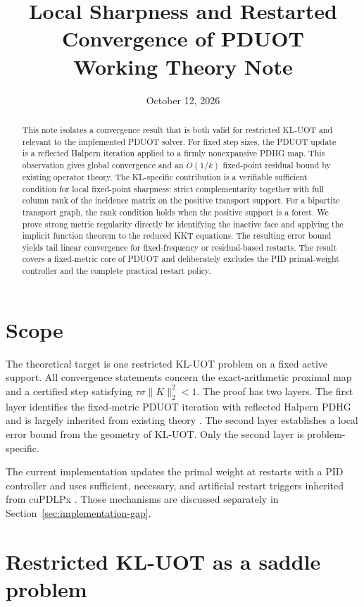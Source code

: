 \documentclass[11pt]{article}
\title{Local Sharpness and Restarted Convergence of PDUOT\\\large Working Theory Note}
\author{}
\date{October 12, 2026}
\begin{document}
\maketitle

\begin{abstract}
This note isolates a convergence result that is both valid for restricted KL-UOT and relevant to the implemented PDUOT solver.
For fixed step sizes, the PDUOT update is a reflected Halpern iteration applied to a firmly nonexpansive PDHG map.
This observation gives global convergence and an $O(1/k)$ fixed-point residual bound by existing operator theory.
The KL-specific contribution is a verifiable sufficient condition for local fixed-point sharpness: strict complementarity together with full column rank of the incidence matrix on the positive transport support.
For a bipartite transport graph, the rank condition holds when the positive support is a forest.
We prove strong metric regularity directly by identifying the inactive face and applying the implicit function theorem to the reduced KKT equations.
The resulting error bound yields tail linear convergence for fixed-frequency or residual-based restarts.
The result covers a fixed-metric core of PDUOT and deliberately excludes the PID primal-weight controller and the complete practical restart policy.
\end{abstract}

\section{Scope}

The theoretical target is one restricted KL-UOT problem on a fixed active support.
All convergence statements concern the exact-arithmetic proximal map and a certified step satisfying $\tau\sigma\lVert K\rVert_2^2<1$.
The proof has two layers.
The first layer identifies the fixed-metric PDUOT iteration with reflected Halpern PDHG and is largely inherited from existing theory \cite{lu2024restarted,liu2026restarted}.
The second layer establishes a local error bound from the geometry of KL-UOT.
Only the second layer is problem-specific.

The current implementation updates the primal weight at restarts with a PID controller and uses sufficient, necessary, and artificial restart triggers inherited from cuPDLPx \cite{lu2025cupdlpx}.
Those mechanisms are discussed separately in Section~\ref{sec:implementation-gap}.

\section{Restricted KL-UOT as a saddle problem}
\end{document}
